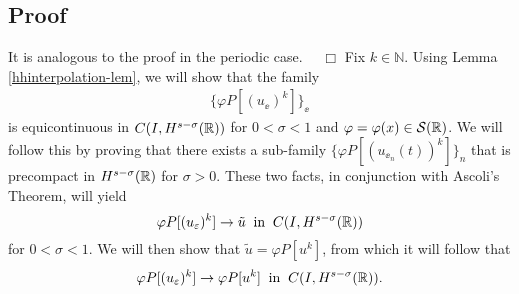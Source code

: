 		\subsection{Proof} It is analogous to the proof in the periodic case.
		$\quad \Box$
		Fix $k \in \mathbb{N}$. Using Lemma \ref{hhinterpolation-lem}, we
		will show that the family
		\begin{equation*}
			\begin{split}
			 \{\varphi P[(u_\ee)^k]\}_\ee
		\end{split}
	\end{equation*}
		is equicontinuous in $C(I, H^{s-\sigma}(\mathbb{R}))$ 
		for $0 < \sigma < 1$ and $\varphi = \varphi(x) \in \mathcal{S}(\mathbb{R})$.
		We will follow this by proving that
		there exists a sub-family $\{\varphi P[(u_{\ee_n}(t))^k]\}_n$
		that is precompact in $H^{s-\sigma}(\mathbb{R})$ for $\sigma > 0$. 
		These two facts, in conjunction with Ascoli's Theorem, will
		yield
		\begin{equation*}
			\label{hhstrong-conv2}
			\varphi P[(u_\varepsilon)^k] \to \tilde{u}
			\; \; \text{in} \; \; C(I,H^{s-\sigma}(\mathbb{R}))
		\end{equation*}
		for $0 < \sigma < 1$.
		We will then show that $\tilde{u} = \varphi P[u^k]$, from which it will
		follow that
		\begin{equation*}
			\label{hhphiplus}
			\begin{split}
				\varphi P[(u_\varepsilon)^k] \to \varphi P[u^k]
				\; \; \text{in} \; \; C(I,H^{s-\sigma}(\mathbb{R})).
			\end{split}
		\end{equation*}
